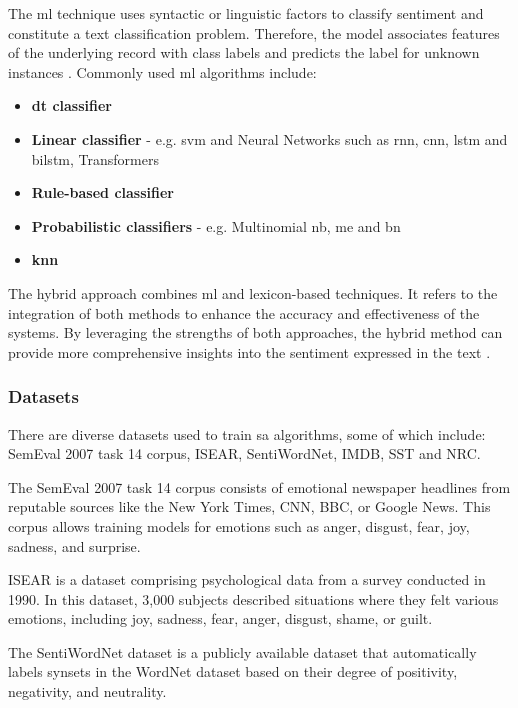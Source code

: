 \documentclass[a4paper,fleqn]{cas-sc}
\begin{document}
The \gls{ml} technique uses syntactic or linguistic factors to classify sentiment and constitute a text classification problem. Therefore, the model associates features of the underlying record with class labels and predicts the label for unknown instances \cite{kaur_survey_2017}. Commonly used \gls{ml} algorithms include:

\begin{itemize}
	\item \textbf{\gls{dt} classifier}
	\item \textbf{Linear classifier} - e.g. \gls{svm} and Neural Networks such as \gls{rnn}, \gls{cnn}, \gls{lstm} and \gls{bilstm}, Transformers
	\item \textbf{Rule-based classifier} 
	\item \textbf{Probabilistic classifiers} - e.g. Multinomial \gls{nb}, \gls{me} and \gls{bn}
	\item \textbf{\gls{knn}}
\end{itemize}

The hybrid approach combines \gls{ml} and lexicon-based techniques. It refers to the integration of both methods to enhance the accuracy and effectiveness of the systems. By leveraging the strengths of both approaches, the hybrid method can provide more comprehensive insights into the sentiment expressed in the text  \cite{wankhade_survey_2022}.

\subsubsection{Datasets}

There are diverse datasets used to train \gls{sa} algorithms, some of which include: SemEval 2007 task 14 corpus, ISEAR, SentiWordNet, IMDB, SST and NRC.

The SemEval 2007 task 14 corpus \cite{strapparava_learning_2008} consists of emotional newspaper headlines from reputable sources like the New York Times, CNN, BBC, or Google News. This corpus allows training models for emotions such as anger, disgust, fear, joy, sadness, and surprise.

ISEAR \cite{ISEAR} is a dataset comprising psychological data from a survey conducted in 1990. In this dataset, 3,000 subjects described situations where they felt various emotions, including joy, sadness, fear, anger, disgust, shame, or guilt.

The SentiWordNet dataset \cite{baccianella_sentiwordnet_2010} is a publicly available dataset that automatically labels synsets in the WordNet dataset based on their degree of positivity, negativity, and neutrality.
\end{document}
